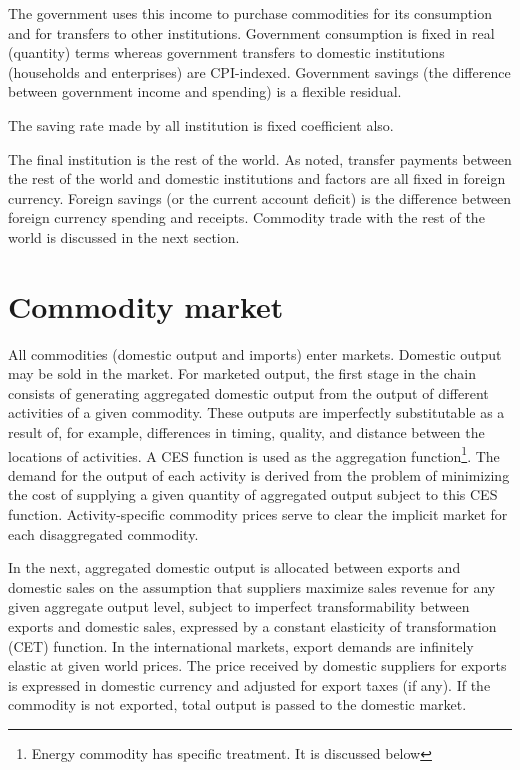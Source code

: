 \documentclass[10pt,a4paper,titlepage,dvipdfmx]{book}
\begin{document}
The government uses this income to purchase commodities for its consumption and for transfers to other institutions. Government consumption is fixed in real (quantity) terms whereas government transfers to domestic institutions (households and enterprises) are CPI-indexed. Government savings (the difference between government income and spending) is a flexible residual. 

The saving rate made by all institution is fixed coefficient also.

The final institution is the rest of the world. As noted, transfer payments between the rest of the world and domestic institutions and factors are all fixed in foreign currency. Foreign savings (or the current account deficit) is the difference between foreign currency spending and receipts. Commodity trade with the rest of the world is discussed in the next section. 

\section{\label{sec:ComMar}Commodity market}

All commodities (domestic output and imports) enter markets. Domestic output may be sold in the market. For marketed output, the first stage in the chain consists of generating aggregated domestic output from the output of different activities of a given commodity. These outputs are imperfectly substitutable as a result of, for example, differences in timing, quality, and distance between the locations of activities. A CES function is used as the aggregation function\footnote{Energy commodity has specific treatment. It is discussed below}. The demand for the output of each activity is derived from the problem of minimizing the cost of supplying a given quantity of aggregated output subject to this CES function. Activity-specific commodity prices serve to clear the implicit market for each disaggregated commodity. 

In the next, aggregated domestic output is allocated between exports and domestic sales on the assumption that suppliers maximize sales revenue for any given aggregate output level, subject to imperfect transformability between exports and domestic sales, expressed by a constant elasticity of transformation (CET) function. In the international markets, export demands are infinitely elastic at given world prices. The price received by domestic suppliers for exports is expressed in domestic currency and adjusted for export taxes (if any). If the commodity is not exported, total output is passed to the domestic market.
\end{document}
